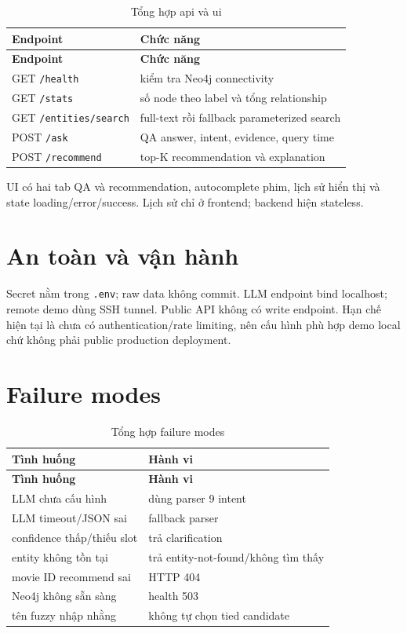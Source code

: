 \begin{longtable}{|>{\raggedright\arraybackslash}p{}|>{\raggedright\arraybackslash}p{}|}
\caption{Tổng hợp api và ui}\label{tab:8-1} \\
\hline
\textbf{Endpoint} & \textbf{Chức năng} \\ \hline
\endfirsthead\hline \textbf{Endpoint} & \textbf{Chức năng} \\ \hline\endhead
GET \texttt{/health} & kiểm tra Neo4j connectivity \\ \hline
GET \texttt{/stats} & số node theo label và tổng relationship \\ \hline
GET \texttt{/entities/search} & full-text rồi fallback parameterized search \\ \hline
POST \texttt{/ask} & QA answer, intent, evidence, query time \\ \hline
POST \texttt{/recommend} & top-K recommendation và explanation \\ \hline
\end{longtable}

UI có hai tab QA và recommendation, autocomplete phim, lịch sử hiển thị và state
loading/error/success. Lịch sử chỉ ở frontend; backend hiện stateless.

\section{An toàn và vận hành}

Secret nằm trong \texttt{.env}; raw data không commit. LLM endpoint bind localhost;
remote demo dùng SSH tunnel. Public API không có write endpoint. Hạn chế hiện tại
là chưa có authentication/rate limiting, nên cấu hình phù hợp demo local chứ
không phải public production deployment.

\section{Failure modes}

\begin{longtable}{|>{\raggedright\arraybackslash}p{}|>{\raggedright\arraybackslash}p{}|}
\caption{Tổng hợp failure modes}\label{tab:8-2} \\
\hline
\textbf{Tình huống} & \textbf{Hành vi} \\ \hline
\endfirsthead\hline \textbf{Tình huống} & \textbf{Hành vi} \\ \hline\endhead
LLM chưa cấu hình & dùng parser 9 intent \\ \hline
LLM timeout/JSON sai & fallback parser \\ \hline
confidence thấp/thiếu slot & trả clarification \\ \hline
entity không tồn tại & trả entity-not-found/không tìm thấy \\ \hline
movie ID recommend sai & HTTP 404 \\ \hline
Neo4j không sẵn sàng & health 503 \\ \hline
tên fuzzy nhập nhằng & không tự chọn tied candidate \\ \hline
\end{longtable}

